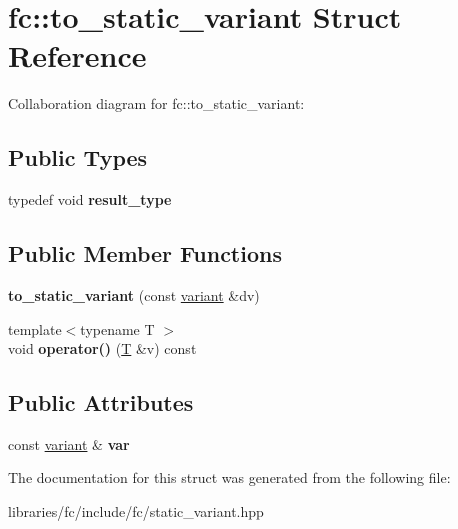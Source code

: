 \hypertarget{structfc_1_1to__static__variant}{}\section{fc\+:\+:to\+\_\+static\+\_\+variant Struct Reference}
\label{structfc_1_1to__static__variant}


Collaboration diagram for fc\+:\+:to\+\_\+static\+\_\+variant\+:
\subsection*{Public Types}
\begin{DoxyCompactItemize}
\item 
\mbox{\label{structfc_1_1to__static__variant_af51db14e05d3d716a61435cf0da84da7}} 
typedef void {\bfseries result\+\_\+type}
\end{DoxyCompactItemize}
\subsection*{Public Member Functions}
\begin{DoxyCompactItemize}
\item 
\mbox{\label{structfc_1_1to__static__variant_ab36494797cd76b9eb01844e2eac08fa5}} 
{\bfseries to\+\_\+static\+\_\+variant} (const \mbox{\hyperlink{classfc_1_1variant}{variant}} \&dv)
\item 
\mbox{\label{structfc_1_1to__static__variant_a85c0345161fea92d7528a5b0743f771d}} 
{\footnotesize template$<$typename T $>$ }\\void {\bfseries operator()} (\mbox{\hyperlink{struct_t}{T}} \&v) const
\end{DoxyCompactItemize}
\subsection*{Public Attributes}
\begin{DoxyCompactItemize}
\item 
\mbox{\label{structfc_1_1to__static__variant_a5bdf204d5d80e06acee6670c7fb5fb29}} 
const \mbox{\hyperlink{classfc_1_1variant}{variant}} \& {\bfseries var}
\end{DoxyCompactItemize}


The documentation for this struct was generated from the following file\+:\begin{DoxyCompactItemize}
\item 
libraries/fc/include/fc/static\+\_\+variant.\+hpp\end{DoxyCompactItemize}
